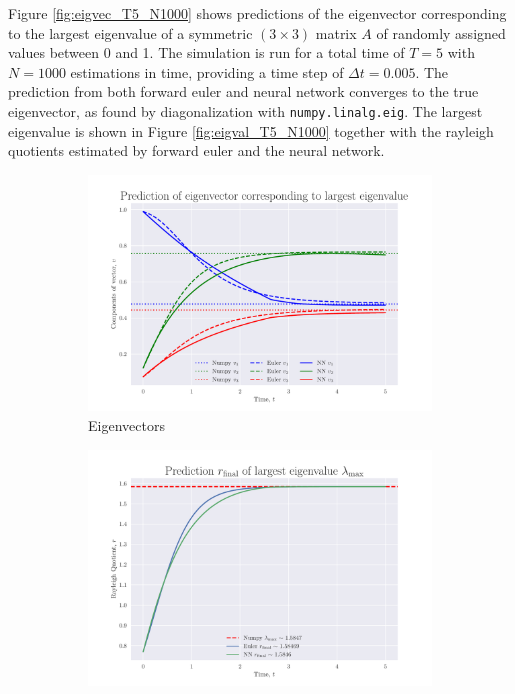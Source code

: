 \documentclass[12pt]{extarticle}
\def\code#1{\texttt{#1}}
\begin{document}
Figure \ref{fig:eigvec_T5_N1000} shows predictions of the eigenvector corresponding to the largest eigenvalue of a symmetric $(3\times 3)$ matrix $A$ of randomly assigned values between 0 and 1. The simulation is run for a total time of $T=5$ with $N=1000$ estimations in time, providing a time step of $\Delta t = 0.005$. The prediction from both forward euler and neural network converges to the true eigenvector, as found by diagonalization with \code{numpy.linalg.eig}. The largest eigenvalue is shown in Figure \ref{fig:eigval_T5_N1000} together with the rayleigh quotients estimated by forward euler and the neural network.

\begin{figure}[h]
	
	\centering
	\begin{subfigure}{0.49\textwidth}
		\centering
		\includegraphics[width=\textwidth]{../output/plots/eigvec_T5_N100.pdf}
		\caption{Eigenvectors}
		\label{fig:eigvec_T5_N100}
	\end{subfigure}
	\hfill
	\begin{subfigure}{0.49\textwidth}
		\centering
		\includegraphics[width=\textwidth]{../output/plots/eigval_T5_N100.pdf}

\end{subfigure}
\end{figure}
\end{document}
